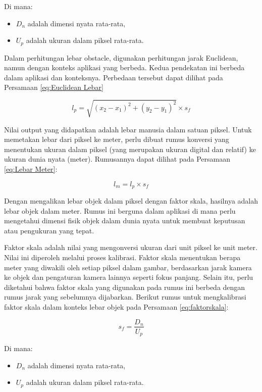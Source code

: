 Di mana:
\begin{itemize}
\item $D_n$ adalah dimensi nyata rata-rata,
\item $U_p$ adalah ukuran dalam piksel rata-rata.
\end{itemize}

Dalam perhitungan lebar obstacle, digunakan perhitungan jarak Euclidean, namun dengan konteks aplikasi yang berbeda. Kedua pendekatan ini berbeda dalam aplikasi dan konteksnya. Perbedaan tersebut dapat dilihat pada Persamaan \ref{eq:Euclidean Lebar}

\begin{equation}
\label{eq:Euclidean Lebar}
l_p = \sqrt{(x_2 - x_1)^2 + (y_2 - y_1)^2} \times s_f
\end{equation}

Nilai output yang didapatkan adalah lebar manusia dalam satuan piksel. Untuk memetakan lebar dari piksel ke meter, perlu dibuat rumus konversi yang menentukan ukuran dalam piksel (yang merupakan ukuran digital dan relatif) ke ukuran dunia nyata (meter). Rumusannya dapat dilihat pada Persamaan \ref{eq:Lebar Meter}:

\begin{equation}
\label{eq:Lebar Meter}
l_m = l_p \times s_f
\end{equation}

Dengan mengalikan lebar objek dalam piksel dengan faktor skala, hasilnya adalah lebar objek dalam meter. Rumus ini berguna dalam aplikasi di mana perlu mengetahui dimensi fisik objek dalam dunia nyata untuk membuat keputusan atau pengukuran yang tepat.

Faktor skala adalah nilai yang mengonversi ukuran dari unit piksel ke unit meter. Nilai ini diperoleh melalui proses kalibrasi. Faktor skala menentukan berapa meter yang diwakili oleh setiap piksel dalam gambar, berdasarkan jarak kamera ke objek dan pengaturan kamera lainnya seperti fokus panjang. Selain itu, perlu diketahui bahwa faktor skala yang digunakan pada rumus ini berbeda dengan rumus jarak yang sebelumnya dijabarkan. Berikut rumus untuk mengkalibrasi faktor skala dalam konteks lebar objek pada Persamaan \ref{eq:faktorskala}:

\begin{equation}
\label{eq:faktorskala}
s_f = \frac{D_n}{U_p}
\end{equation}

Di mana:
\begin{itemize}
\item $D_n$ adalah dimensi nyata rata-rata,
\item $U_p$ adalah ukuran dalam piksel rata-rata.
\end{itemize}


